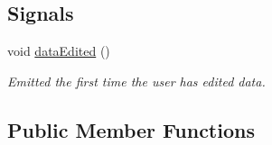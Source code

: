 \subsection*{Signals}
\begin{DoxyCompactItemize}
\item 
void \hyperlink{classmdt_sql_field_handler_a111eebc8905151a5938950e23e61ff90}{data\-Edited} ()
\begin{DoxyCompactList}\small\item\em Emitted the first time the user has edited data. \end{DoxyCompactList}\end{DoxyCompactItemize}
\subsection*{Public Member Functions}

